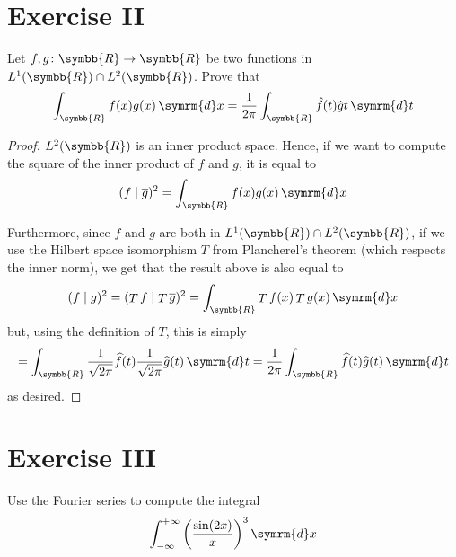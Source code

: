 \documentclass[a4paper, 12pt]{article}
\newcommand*\diff{\mathop{}\!\symrm{d}}
\newcommand*{\reals}{\symbb{R}}
\begin{document}
\section*{Exercise II}

Let \(f, g \colon \reals \to \reals\) be two functions in \(L^1 (\reals) \cap L^2 (\reals)\). Prove that
\[
    \int_{\reals} f(x) g(x) \diff x = \frac{1}{2 \pi} \int_{\reals} \hat{f}(t) \hat{g}{t} \diff t
\]

\begin{proof}
\(L^2 (\reals)\) is an inner product space. Hence, if we want to compute the square of the inner product of \(f\) and \(g\), it is equal to
\[
    (f \mid \overline{g})^2 = \int_{\reals} f(x) g(x) \diff x
\]

Furthermore, since \(f\) and \(g\) are both in \(L^1(\reals) \cap L^2(\reals)\), if we use the Hilbert space isomorphism \(T\) from Plancherel's theorem (which respects the inner norm), we get that the result above is also equal to
\[
    (f \mid g)^2 = (\mathop{T} f \mid \mathop{T} \overline{g})^2 = \int_{\reals} \mathop{T} f(x) \mathop{T} g(x) \diff x
\]
but, using the definition of \(T\), this is simply
\[
    = \int_{\reals} \frac{1}{\sqrt{2 \pi}} \widehat{f}(t) \frac{1}{\sqrt{2 \pi}} \widehat{g}(t) \diff t = \frac{1}{2\pi} \int_{\reals} \widehat{f}(t) \widehat{g}(t) \diff t
\]
as desired.
\end{proof}

\section*{Exercise III}

Use the Fourier series to compute the integral
\[
    \int_{- \infty}^{+ \infty} \left(\frac{\sin (2x)}{x}\right)^3 \diff x
\]
\end{document}
